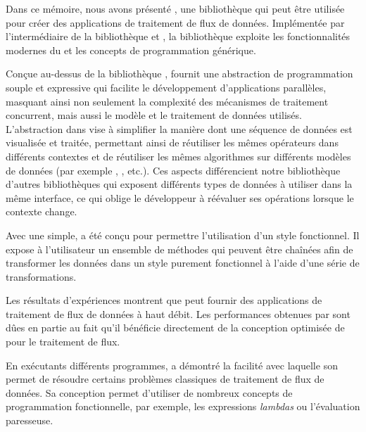 
\begin{conclusion}
\label{conclusion.chap}

Dans ce m\'emoire, nous avons pr\'esent\'e , une bibliothèque  qui peut \^etre utilis\'ee pour cr\'eer des applications de traitement de flux de donn\'ees. Impl\'ement\'ee par l'interm\'ediaire de la biblioth\`eque  et , la bibliothèque exploite les fonctionnalit\'es modernes du  et les concepts de programmation g\'en\'erique.

Con\c{c}ue au-dessus de la biblioth\`eque ,  fournit une abstraction de programmation souple et expressive qui facilite le d\'eveloppement d'applications parall\`eles, masquant ainsi non seulement la complexit\'e des m\'ecanismes de traitement concurrent, mais aussi le mod\`ele et le traitement de donn\'ees utilis\'es. L'abstraction dans  vise \`a simplifier la mani\`ere dont une s\'equence de donn\'ees est visualis\'ee et trait\'ee, permettant ainsi de r\'eutiliser les m\^emes op\'erateurs dans diff\'erents contextes et de r\'eutiliser les m\^emes algorithmes sur diff\'erents mod\`eles de donn\'ees (par exemple , ,  etc.). Ces aspects diff\'erencient notre bibliothèque d'autres bibliothèques qui exposent diff\'erents types de donn\'ees \`a utiliser dans la m\^eme interface, ce qui oblige le d\'eveloppeur \`a r\'e\'evaluer ses op\'erations lorsque le contexte change.

Avec une  simple,  a \'et\'e con\c{c}u pour permettre l'utilisation d'un style fonctionnel. Il expose \`a l'utilisateur un ensemble de m\'ethodes qui peuvent \^etre cha\^in\'ees afin de transformer les donn\'ees dans un style purement fonctionnel \`a l'aide d'une s\'erie de transformations.


Les r\'esultats d'exp\'eriences montrent que  peut fournir des applications de traitement de flux de donn\'ees \`a haut d\'ebit. Les performances obtenues par  sont d\^ues en partie au fait qu'il b\'en\'eficie directement de la conception optimis\'ee de  pour le traitement de flux.

En ex\'ecutants diff\'erents programmes,  a d\'emontr\'e la facilit\'e avec laquelle son  permet de r\'esoudre certains probl\`emes classiques de traitement de flux de donn\'ees. Sa conception permet d'utiliser de nombreux concepts de programmation fonctionnelle, par exemple, les expressions \emph{lambdas} ou l'\'evaluation paresseuse.


\end{conclusion}
